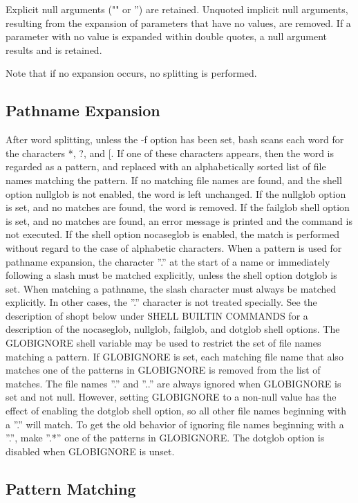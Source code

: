 Explicit null arguments ("" or '') are retained. Unquoted implicit null arguments, resulting from the expansion of parameters that have no values, are removed. If a parameter with no value is expanded within double quotes, a null argument results and is retained.

Note that if no expansion occurs, no splitting is performed.

\subsection{Pathname Expansion}\label{sec:pathnameexpansion}

After word splitting, unless the -f option has been set, bash scans each word for the characters *, ?, and [. If one of these characters appears, then the word is regarded as a pattern, and replaced with an alphabetically sorted list of file names matching the pattern. If no matching file names are found, and the shell option nullglob is not enabled, the word is left unchanged. If the nullglob option is set, and no matches are found, the word is removed. If the failglob shell option is set, and no matches are found, an error message is printed and the command is not executed. If the shell option nocaseglob is enabled, the match is performed without regard to the case of alphabetic characters. When a pattern is used for pathname expansion, the character ''.'' at the start of a name or immediately following a slash must be matched explicitly, unless the shell option dotglob is set. When matching a pathname, the slash character must always be matched explicitly. In other cases, the ''.'' character is not treated specially. See the description of shopt below under SHELL BUILTIN COMMANDS for a description of the nocaseglob, nullglob, failglob, and dotglob shell options.
The GLOBIGNORE shell variable may be used to restrict the set of file names matching a pattern. If GLOBIGNORE is set, each matching file name that also matches one of the patterns in GLOBIGNORE is removed from the list of matches. The file names ''.'' and ''..'' are always ignored when GLOBIGNORE is set and not null. However, setting GLOBIGNORE to a non-null value has the effect of enabling the dotglob shell option, so all other file names beginning with a ''.'' will match. To get the old behavior of ignoring file names beginning with a ''.'', make ''.*'' one of the patterns in GLOBIGNORE. The dotglob option is disabled when GLOBIGNORE is unset.

\subsection{Pattern Matching}\label{sec:patternmatching}


